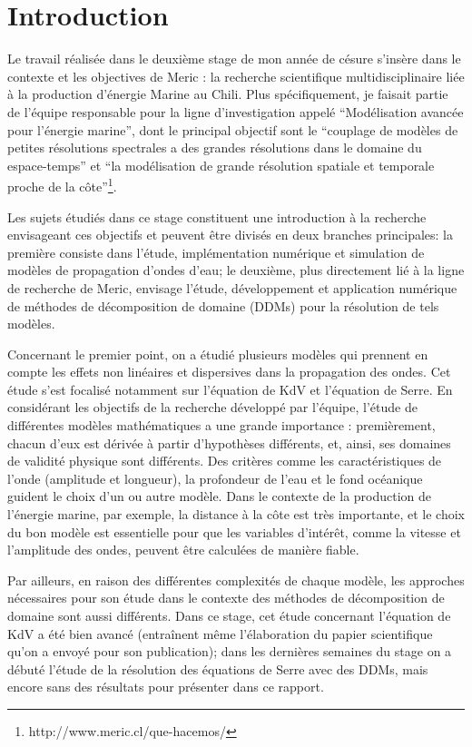 \section{Introduction}

\indent Le travail réalisée dans le deuxième stage de mon année de césure s'insère dans le contexte et les objectives de Meric : la recherche scientifique multidisciplinaire liée à la production d'énergie Marine au Chili. Plus spécifiquement, je faisait partie de l'équipe responsable pour la ligne d'investigation appelé ``Modélisation avancée pour l'énergie marine'', dont le principal objectif sont le ``couplage de modèles de petites résolutions spectrales a des grandes résolutions dans le domaine du espace-temps'' et ``la modélisation de grande résolution spatiale et temporale proche de la côte''\footnote{http://www.meric.cl/que-hacemos/}.

\indent Les sujets étudiés dans ce stage constituent une introduction à la recherche envisageant ces objectifs et peuvent être divisés en deux branches principales: la première consiste dans l'étude, implémentation numérique et simulation de modèles de propagation d'ondes d'eau; le deuxième, plus directement lié à la ligne de recherche de Meric, envisage l'étude, développement et application numérique de méthodes de décomposition de domaine (DDMs) pour la résolution de tels modèles.

\indent Concernant le premier point, on a étudié plusieurs modèles qui prennent en compte les effets non linéaires et dispersives dans la propagation des ondes. Cet étude s'est focalisé notamment sur l'équation de KdV et l'équation de Serre. En considérant les objectifs de la recherche développé par l'équipe, l'étude de différentes modèles mathématiques a une grande importance : premièrement, chacun d'eux est dérivée à partir d'hypothèses différents, et, ainsi, ses domaines de validité physique sont différents. Des critères comme les caractéristiques de l'onde (amplitude et longueur), la profondeur de l'eau et le fond océanique guident le choix d'un ou autre modèle. Dans le contexte de la production de l'énergie marine, par exemple, la distance à la côte est très importante, et le choix du bon modèle est essentielle pour que les variables d'intérêt, comme la vitesse et l'amplitude des ondes, peuvent être calculées de manière fiable.

\indent Par ailleurs, en raison des différentes complexités de chaque modèle, les approches nécessaires pour son étude dans le contexte des méthodes de décomposition de domaine sont aussi différents. Dans ce stage, cet étude concernant l'équation de KdV a été bien avancé (entraînent même l'élaboration du papier scientifique qu'on a envoyé pour son publication); dans les dernières semaines du stage on a débuté l'étude de la résolution des équations de Serre avec des DDMs, mais encore sans des résultats pour présenter dans ce rapport.

